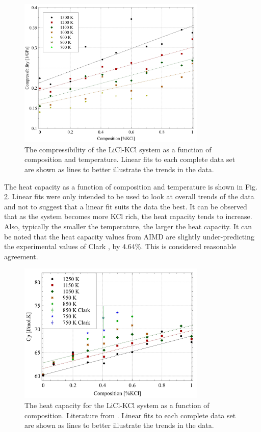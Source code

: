 \documentclass[review]{elsarticle}
\begin{document}
\begin{figure}[h]
 \centering
 \includegraphics[width=0.8\textwidth]{images/compressibility.jpg} 
 \caption{The compressibility of the LiCl-KCl system as a function of composition and temperature. Linear fits to each complete data set are shown as lines to better illustrate the trends in the data. }
 \label{fig:compressibility}
\end{figure} 

The heat capacity as a function of composition and temperature is shown in Fig. \ref{fig:cp}. Linear fits were only intended to be used to look at overall trends of the data and not to suggest that a linear fit suits the data the best. It can be observed that as the system becomes more KCl rich, the heat capacity tends to increase. Also, typically the smaller the temperature, the larger the heat capacity. It can be noted that the heat capacity values from AIMD are slightly under-predicting the experimental values of Clark \cite{clark1973}, by 4.64\%. This is considered reasonable agreement.

\begin{figure}[h]
 \centering
 \includegraphics[width=0.8\textwidth]{images/cp.jpg} 
 \caption{The heat capacity for the LiCl-KCl system as a function of composition. Literature from \cite{janz1975molten,clark1973}. Linear fits to each complete data set are shown as lines to better illustrate the trends in the data. }
 \label{fig:cp}   
\end{figure} 
\end{document}
